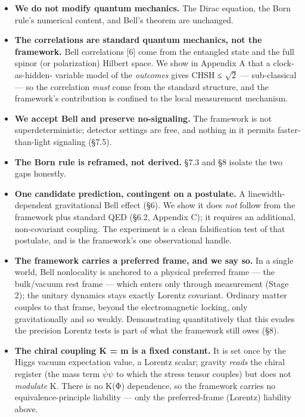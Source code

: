 \documentclass[
]{article}
\providecommand{\tightlist}{%
  \setlength{\itemsep}{0pt}\setlength{\parskip}{0pt}}
\begin{document}
\begin{itemize}
\tightlist
\item
  \textbf{We do not modify quantum mechanics.} The Dirac equation, the
  Born rule's numerical content, and Bell's theorem are unchanged.
\item
  \textbf{The correlations are standard quantum mechanics, not the
  framework.} Bell correlations {[}6{]} come from the entangled state
  and the full spinor (or polarization) Hilbert space. We show in
  Appendix A that a clock-as-hidden- variable model of the
  \emph{outcomes} gives CHSH ≤ \(\sqrt{2}\) --- sub-classical --- so the
  correlation \emph{must} come from the standard structure, and the
  framework's contribution is confined to the local measurement
  mechanism.
\item
  \textbf{We accept Bell and preserve no-signaling.} The framework is
  not superdeterministic; detector settings are free, and nothing in it
  permits faster-than-light signaling (§7.5).
\item
  \textbf{The Born rule is reframed, not derived.} §7.3 and §8 isolate
  the two gaps honestly.
\item
  \textbf{One candidate prediction, contingent on a postulate.} A
  linewidth-dependent gravitational Bell effect (§6). We show it does
  \emph{not} follow from the framework plus standard QED (§6.2, Appendix
  C); it requires an additional, non-covariant coupling. The experiment
  is a clean falsification test of that postulate, and is the
  framework's one observational handle.
\item
  \textbf{The framework carries a preferred frame, and we say so.} In a
  single world, Bell nonlocality is anchored to a physical preferred
  frame --- the bulk/vacuum rest frame --- which enters only through
  measurement (Stage 2); the unitary dynamics stays exactly Lorentz
  covariant. Ordinary matter couples to that frame, beyond the
  electromagnetic locking, only gravitationally and so weakly.
  Demonstrating quantitatively that this evades the precision Lorentz
  tests is part of what the framework still owes (§8).
\item
  \textbf{The chiral coupling K = m is a fixed constant.} It is set once
  by the Higgs vacuum expectation value, a Lorentz scalar; gravity
  \emph{reads} the chiral register (the mass term \(\bar\psi\psi\) to
  which the stress tensor couples) but does not \emph{modulate} K. There
  is no K(Φ) dependence, so the framework carries no
  equivalence-principle liability --- only the preferred-frame (Lorentz)
  liability above.
\end{itemize}
\end{document}
